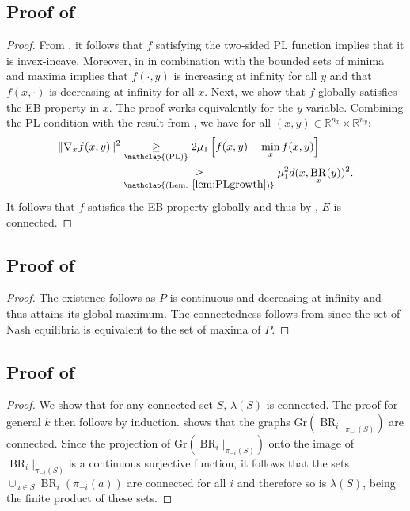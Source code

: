 \documentclass{article}
\newcommand{\R}{\mathbb{R}}
\DeclareMathOperator{\BR}{BR}
\newcommand{\Gr}{\text{Gr}}
\begin{document}
\subsection{Proof of }
\label{sec:proof:PLconnected}
\begin{proof}
    From , it follows that $f$ satisfying the two-sided PL function implies that it is invex-incave. Moreover,  in  in combination with the bounded sets of minima and maxima implies that $f(\cdot,y)$ is increasing at infinity for all $y$ and that $f(x,\cdot)$ is decreasing at infinity for all $x$. Next, we show that $f$ globally satisfies the EB property in $x$. The proof works equivalently for the $y$ variable. 
    Combining the PL condition with the result from , we have for all $(x,y)\in \R^{n_x}\times \R^{n_y}$:
    \begin{align*}
        \|\nabla_x f(x,y) \|^2 &\underset{\mathclap{(\text{PL})}}{\geq} 2 \mu_1\left[f(x, y)-\min _x f(x, y)\right] \\
        & \underset{\mathclap{(\text{Lem. }\ref{lem:PLgrowth})}}{\geq} \mu_1^2 d(x,\BR_x(y))^2.
    \end{align*}
    It follows that $f$ satisfies the EB property globally and thus by , $E$ is connected.
\end{proof}




\subsection{Proof of }
\label{sec:proof:incave_potential}
\begin{proof}
    The existence follows as $P$ is continuous and decreasing at infinity and thus attains its global maximum. The connectedness follows from  since the set of Nash equilibria is equivalent to the set of maxima of $P$.
\end{proof}
\subsection{Proof of }
\label{sec:proof:connected_k_rationalizable}
\begin{proof}
    We show that for any connected set $S$, $\lambda(S)$ is connected. The proof for general $k$ then follows by induction.  shows that the graphs $\Gr(\BR_i|_{\pi_{-i}(S)})$ are connected. Since the projection of $\Gr(\BR_i|_{\pi_{-i}(S)})$ onto the image of $\BR_i|_{\pi_{-i}(S)}$ is a continuous surjective function, it follows that the sets $\cup_{a \in S}\BR_i(\pi_{-i}(a))$ are connected for all $i$ and therefore so is $\lambda(S)$, being the finite product of these sets.
\end{proof}
\end{document}

